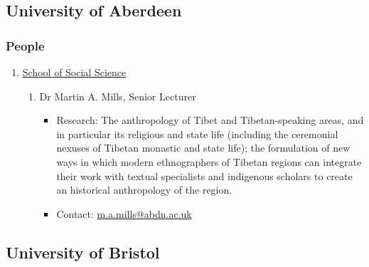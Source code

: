 \documentclass[a4paper,10.5pt]{article}
\begin{document}
\subsection{University of Aberdeen}
\label{sec:orgf99714d}
\subsubsection{People}
\label{sec:org602e2f9}
\begin{enumerate}
\item \href{https://www.abdn.ac.uk/socsci/}{School of Social Science}
\label{sec:org001d3ea}
\begin{enumerate}
\item Dr Martin A. Mills, Senior Lecturer
\label{sec:org0c85ade}
\begin{itemize}
\item Research: The anthropology of Tibet and Tibetan-speaking areas, and in particular its religious and state life (including the ceremonial nexuses of Tibetan monastic and state life); the formulation of new ways in which modern ethnographers of Tibetan regions can integrate their work with textual specialists and indigenous scholars to create an historical anthropology of the region.\\
\item Contact: \href{mailto:m.a.mills@abdn.ac.uk}{m.a.mills@abdn.ac.uk}\\
\end{itemize}
\end{enumerate}
\end{enumerate}
\subsection{University of Bristol}
\label{sec:orge8180f1}
\end{document}
